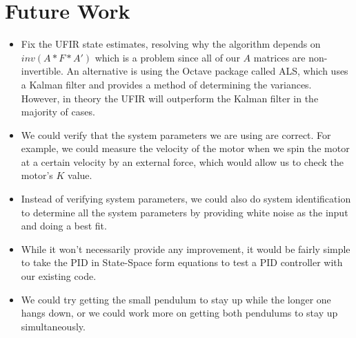 \documentclass{article}
\begin{document}
\section{Future Work}
\begin{itemize}
\item Fix the UFIR state estimates, resolving why the algorithm depends on $inv(A*F*A')$ which is a problem since all of our $A$ matrices are non-invertible. An alternative is using the Octave package called ALS, which uses a Kalman filter and provides a method of determining the variances. However, in theory the UFIR will outperform the Kalman filter in the majority of cases.
\item We could verify that the system parameters we are using are correct. For example, we could measure the velocity of the motor when we spin the motor at a certain velocity by an external force, which would allow us to check the motor's $K$ value.
\item Instead of verifying system parameters, we could also do system identification to determine all the system parameters by providing white noise as the input and doing a best fit.
\item While it won't necessarily provide any improvement, it would be fairly simple to take the PID in State-Space form equations to test a PID controller with our existing code.
\item We could try getting the small pendulum to stay up while the longer one hangs down, or we could work more on getting both pendulums to stay up simultaneously.
\end{itemize}
\end{document}

